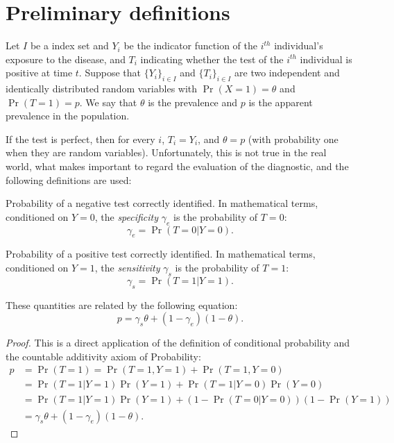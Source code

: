 \section{Preliminary definitions}

Let $I$ be a index set and $Y_i$ be the indicator function of the $i^{th}$ individual's exposure to the disease, and $T_i$
indicating whether the test of the $i^{th}$ individual is positive at time
$t$. Suppose that $\{Y_i\}_{i \in I}$ and $\{T_i\}_{i \in I}$ are two independent and identically distributed
random variables with $\Pr(X = 1) = \theta$ and $\Pr(T = 1) = p$. We say that
$\theta$ is the prevalence and $p$ is the apparent prevalence in the
population. 

If the test is perfect, then for every $i$, $T_i = Y_i$, and
$\theta = p$ (with probability one when they are random variables).
Unfortunately, this is not true in the real world, what makes important to
regard the evaluation of the diagnostic, and the following definitions are used:

\begin{definition}[Specificity]
  Probability of a negative test correctly identified. In mathematical terms,
  conditioned on $Y = 0$, the {\em specificity} $\gamma_e$ is the probability of $T = 0$: 
  \begin{equation}
    \gamma_e = \Pr(T = 0|Y = 0). 
  \end{equation} 
\end{definition}

\begin{definition}[Sensitivity]
  Probability of a positive test correctly identified. In mathematical terms,
  conditioned on $Y = 1$, the {\em sensitivity} $\gamma_s$ is the probability of $T = 1$: 
  \begin{equation}
    \gamma_s = \Pr(T = 1|Y = 1). 
  \end{equation} 
\end{definition}

\begin{theorem} These quantities are related by the following equation:
  \begin{equation}
    p = \gamma_s\theta + (1-\gamma_e)(1-\theta).
  \end{equation}
  
\end{theorem}

\begin{proof}
  This is a direct application of the definition of conditional probability
  and the countable additivity axiom of Probability:
  \begin{equation*}
    \begin{split}
      p &= \Pr(T = 1) = \Pr(T = 1, Y = 1) + \Pr(T = 1, Y = 0) \\
      &= \Pr(T=1|Y=1)\Pr(Y=1) + \Pr(T=1|Y=0)\Pr(Y=0) \\
      &= \Pr(T=1|Y=1)\Pr(Y=1) + (1 - \Pr(T=0|Y=0))(1-\Pr(Y=1)) \\
      &= \gamma_s\theta + (1 - \gamma_e)(1-\theta).
    \end{split}
  \end{equation*} 
\end{proof}

